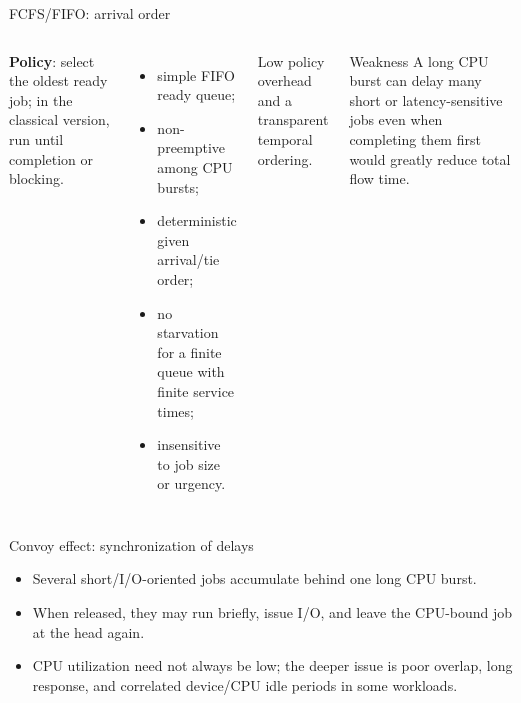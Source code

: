 \documentclass[aspectratio=169,11pt]{beamer}
\newcommand{\concept}[1]{\textcolor{osblue}{\textbf{#1}}}
\begin{document}
\begin{frame}{FCFS/FIFO: arrival order}
  \begin{columns}[T,onlytextwidth]
      \concept{Policy}: select the oldest ready job; in the classical version, run until completion or blocking.
      \begin{itemize}
        \item simple FIFO ready queue;
        \item non-preemptive among CPU bursts;
        \item deterministic given arrival/tie order;
        \item no starvation for a finite queue with finite service times;
        \item insensitive to job size or urgency.
      \end{itemize}
      \begin{tcolorbox}[title=Strength]
        Low policy overhead and a transparent temporal ordering.
      \end{tcolorbox}
      \begin{alertblock}{Weakness}
        A long CPU burst can delay many short or latency-sensitive jobs even when completing them first would greatly reduce total flow time.
      \end{alertblock}
  \end{columns}
\end{frame}

\begin{frame}{Convoy effect: synchronization of delays}
  \centering
  \begin{itemize}
    \item Several short/I/O-oriented jobs accumulate behind one long CPU burst.
    \item When released, they may run briefly, issue I/O, and leave the CPU-bound job at the head again.
    \item CPU utilization need not always be low; the deeper issue is poor overlap, long response, and correlated device/CPU idle periods in some workloads.
  \end{itemize}
\end{frame}
\end{document}

